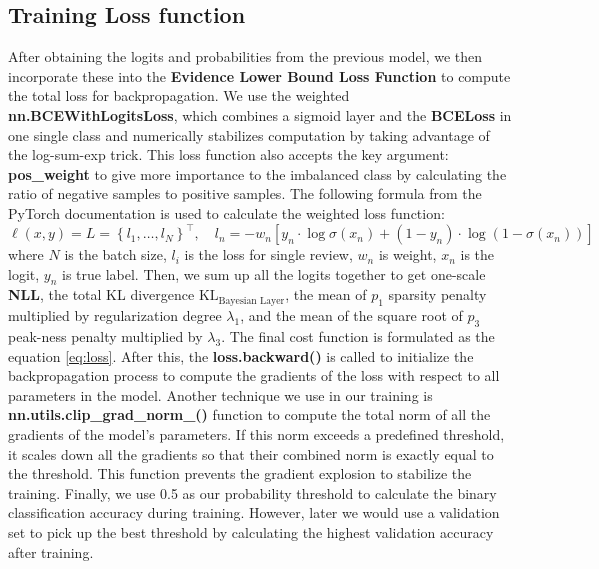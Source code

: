 \documentclass{article}
\begin{document}
\subsection{Training Loss function}
After obtaining the logits and probabilities from the previous model, we then incorporate these into the \textbf{Evidence Lower Bound Loss Function} to compute the total loss for backpropagation. We use the weighted \textbf{nn.BCEWithLogitsLoss}, which combines a sigmoid layer and the \textbf{BCELoss} in one single class and numerically stabilizes computation by taking advantage of the log-sum-exp trick. This loss function also accepts the key argument: \textbf{pos\_weight} to give more importance to the imbalanced class by calculating the ratio of negative samples to positive samples. The following formula from the PyTorch documentation is used to calculate the weighted loss function:
$$\ell(x, y)=L=\left\{l_1, \ldots, l_N\right\}^{\top}, \quad l_n=-w_n\left[y_n \cdot \log \sigma\left(x_n\right)+\left(1-y_n\right) \cdot \log \left(1-\sigma\left(x_n\right)\right)\right]$$ where $N$ is the batch size, $l_i$ is the loss for single review, $w_n$ is weight, $x_n$ is the logit, $y_n$ is true label. Then, we sum up all the logits together to get one-scale \textbf{NLL}, the total KL divergence $\text{KL}_{\text{Bayesian Layer}}$, the mean of $p_1$ sparsity penalty multiplied by regularization degree $\lambda_1$, and the mean of the square root of $p_3$ peak-ness penalty multiplied by $\lambda_3$. The final cost function is formulated as the equation \ref{eq:loss}. After this, the \textbf{loss.backward()} is called to initialize the backpropagation process to compute the gradients of the loss with respect to all parameters in the model. Another technique we use in our training is \textbf{nn.utils.clip\_grad\_norm\_()} function to compute the total norm of all the gradients of the model's parameters. If this norm exceeds a predefined threshold, it scales down all the gradients so that their combined norm is exactly equal to the threshold. This function prevents the gradient explosion to stabilize the training. Finally, we use 0.5 as our probability threshold to calculate the binary classification accuracy during training. However, later we would use a validation set to pick up the best threshold by calculating the highest validation accuracy after training. 
\end{document}
